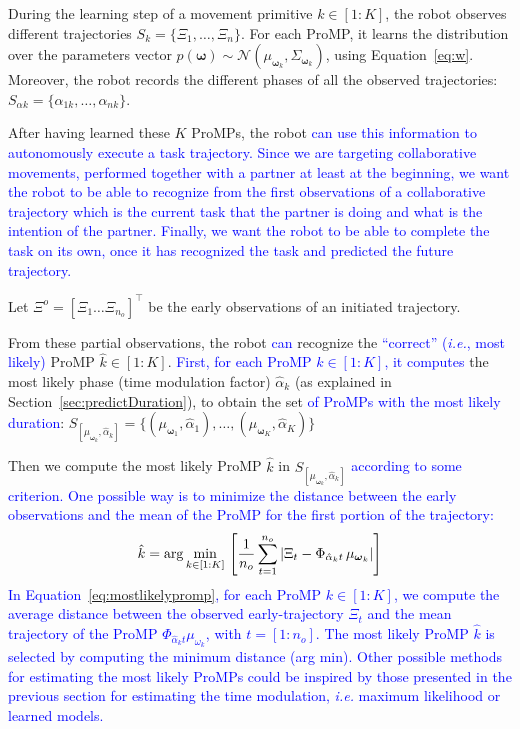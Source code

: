\documentclass[utf8]{frontiersSCNS} %
\newcommand{\rev}[1]{\textcolor{blue}{#1}}
\newcommand{\todo}[1]{\textcolor{red}{\textbf{/*#1*/}}}
\begin{document}
During the learning step of a movement primitive $k \in [1:K]$, the robot observes different trajectories $S_k = \{\Xi_1,\ldots,\Xi_n\}$. For each ProMP, it learns the distribution over the parameters vector $p(\boldsymbol{\omega}) \sim \mathcal{N}(\mu_{\boldsymbol{\omega}_k}, \Sigma_{\boldsymbol{\omega}_k})$, using Equation~\ref{eq:w}. Moreover, the robot records the different phases of all the observed trajectories: $ S_{\alpha k} = \{\alpha_{1k},\ldots,\alpha_{nk}\}$.

After having learned these $K$ ProMPs, the robot \rev{can use this information to autonomously execute a task trajectory. Since we are targeting collaborative movements, performed together with a partner at least at the beginning, we want the robot to be able to recognize from the first observations of a collaborative trajectory which is the current task that the partner is doing and what is the intention of the partner. Finally, we want the robot to be able to complete the task on its own, once it has recognized the task and predicted the future trajectory. }

Let $\Xi^{o} = [\Xi_1 \ldots \Xi_{n_o}]^\top$ be the early observations of an initiated trajectory.

From these partial observations, the robot \rev{can} recognize the \rev{``correct'' (\textit{i.e.}, most likely)} ProMP $\hat{k} \in [1:K]$.
\rev{First, for each ProMP $k \in [1:K]$, it computes} the most likely phase (time modulation factor) $\hat{\alpha}_k$ (as explained in Section~\ref{sec:predictDuration}), to obtain the set \rev{of ProMPs with the most likely duration}: $S_{[\mu_{\boldsymbol{\omega}_k}, \hat{\alpha}_k]} = \{(\mu_{\boldsymbol{\omega}_1},\hat{\alpha}_1),\ldots,(\mu_{\boldsymbol{\omega}_K},\hat{\alpha}_K)\}$

Then we compute the most likely ProMP $\hat{k}$ in  $S_{[\mu_{\boldsymbol{\omega}_k}, \hat{\alpha}_k]}$ \rev{according to some criterion.
One possible way is to minimize the distance between the early observations and the mean of the ProMP for the first portion of the trajectory:}
\begin{equation} \label{eq:mostlikelypromp}
\hat{k} = \arg \min_{k \in [1:K]} \,   \left[      {1 \over n_o} \sum_{t=1}^{n_o}| \Xi_{t} - \Phi_{\hat{\alpha}_k t} \, \mu_{\boldsymbol{\omega}_k} | \right]
\end{equation}
\rev{In Equation~\ref{eq:mostlikelypromp}, for each ProMP $k \in [1:K]$, we compute the average distance between the observed early-trajectory $\Xi_t$ and the mean trajectory of the ProMP $\Phi_{\hat{\alpha}_k t} \mu_{\omega_k}$, with $t = [1:n_o]$.
The most likely ProMP $\hat{k}$ is selected by computing the minimum distance (arg min). Other possible methods for estimating the most likely ProMPs could be inspired by those presented in the previous section for estimating the time modulation, \textit{i.e.} maximum likelihood or learned models.
}
\end{document}
